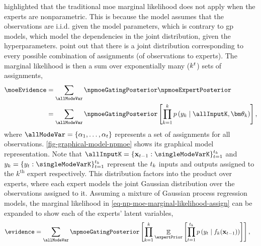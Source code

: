 \documentclass{mimosis-class/mimosis}
\numberwithin{equation}{chapter}
\DeclareMathOperator{\E}{\mathbb{E}}
\newcommand{\numData}{\ensuremath{t}}
\newcommand{\modeInd}{\ensuremath{k}}
\newcommand{\NumData}{\ensuremath{\MakeUppercase{\numData}}}
\newcommand{\ModeInd}{\ensuremath{\MakeUppercase{\modeInd}}}
\newcommand{\singleData}[1]{\ensuremath{#1_{\numData}}}
\newcommand{\allData}[1]{\ensuremath{\MakeUppercase{#1}}}
\newcommand{\allOutputK}{\ensuremath{\mode{\allOutput}}}
\newcommand{\mode}[1]{\ensuremath{#1_{\modeInd}}}
\newcommand{\x}{\ensuremath{\mathbf{x}}}
\newcommand{\y}{\ensuremath{y}}
\newcommand{\singleInput}{\ensuremath{\x_{\numData-1}}}
\newcommand{\singleOutput}{\ensuremath{\singleData{\y}}}
\newcommand{\allOutput}{\ensuremath{\allData{\y}}}
\newcommand{\modeVar}{\ensuremath{\alpha}}
\newcommand{\latentFunc}{\ensuremath{f}}
\newcommand{\expertParamsK}{\ensuremath{\mode{\bm\theta}}}
\begin{document}
{\cite{rasmussenInfinite2001} highlighted that the traditional \acrshort{moe} marginal likelihood does not apply when the
experts are nonparametric.
This is because the model assumes that the observations are i.i.d. given the model parameters,
which is contrary to \acrshort{gp} models, which model the dependencies in the joint distribution, given the
hyperparameters.
\cite{rasmussenInfinite2001} point out that there is a joint distribution corresponding to every possible
combination of assignments (of observations to experts).
The marginal likelihood is then a sum over exponentially many (\(\ModeInd^{\NumData}\)) sets of assignments,
\small
\begin{align}  \label{eq-np-moe-marginal-likelihood-assign}
\moeEvidence &= \sum_{\allModeVar} \npmoeGatingPosterior \npmoeExpertPosterior  \nonumber \\
&= \sum_{\allModeVar} \npmoeGatingPosterior
\left[ \prod_{\modeInd=1}^\ModeInd p\left(\allOutputK \mid \allInputK, \expertParamsK \right) \right],
\end{align}
\normalsize
where \(\allModeVar = \{\modeVar_1, \ldots, \modeVar_\NumData \}\) represents a set of assignments for all observations.
\cref{fig-graphical-model-npmoe} shows its graphical model representation.
Note that \(\allInputK = \{\singleInput : \singleModeVarK \}_{\numData=1}^{\NumData_{\modeInd}}\) and
\(\allOutputK = \{\singleOutput : \singleModeVarK \}_{\numData=1}^{\NumData_{\modeInd}}\)
represent the \(\NumData_{\modeInd}\) inputs and outputs assigned to the \(\modeInd^{\text{th}}\)
expert respectively.
This distribution factors into the product over experts, where each expert models the joint Gaussian distribution
over the observations assigned to it.
Assuming a mixture of Gaussian process regression models,
the marginal likelihood in \cref{eq-np-moe-marginal-likelihood-assign}
can be expanded to show each of the experts' latent variables,
\begin{align} \label{eq-np-moe-marginal-likelihood}
\evidence
&= \sum_{\allModeVar} \npmoeGatingPosterior
\left[ \prod_{\modeInd=1}^\ModeInd
\E_{\expertPrior} \left[
\prod_{\numData=1}^{\NumData_{\modeInd}}
p\left(\singleOutput \mid \mode{\latentFunc}(\singleInput) \right)
\right] \right],
\end{align}
}
\end{document}
